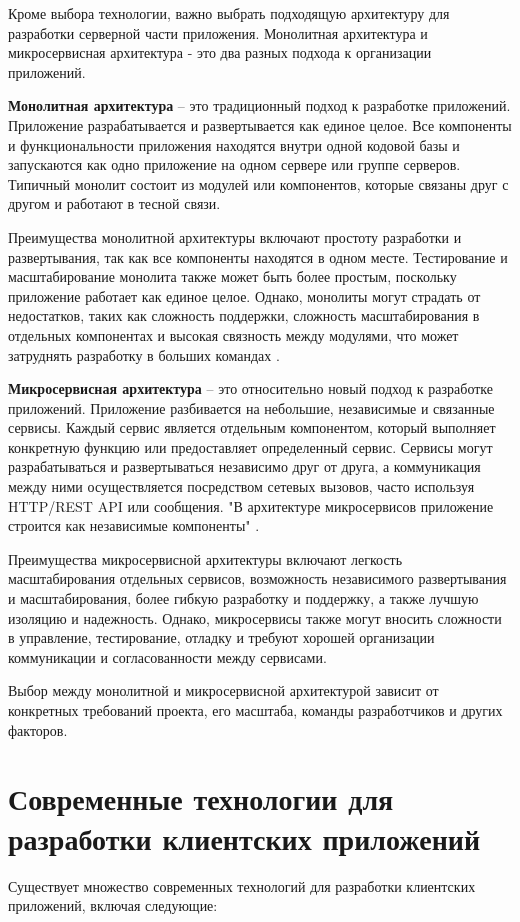 Кроме выбора технологии, важно выбрать подходящую архитектуру для разработки серверной части приложения.
Монолитная архитектура и микросервисная архитектура - это два разных подхода к организации приложений.

\textbf{Монолитная архитектура} -- это традиционный подход к разработке приложений. 
Приложение разрабатывается и развертывается как единое целое. 
Все компоненты и функциональности приложения находятся внутри одной кодовой базы и запускаются как одно приложение на одном сервере или группе серверов. 
Типичный монолит состоит из модулей или компонентов, которые связаны друг с другом и работают в тесной связи.

Преимущества монолитной архитектуры включают простоту разработки и развертывания, 
так как все компоненты находятся в одном месте. 
Тестирование и масштабирование монолита также может быть более простым, 
поскольку приложение работает как единое целое. Однако, монолиты могут страдать от недостатков, 
таких как сложность поддержки, сложность масштабирования в отдельных компонентах и 
высокая связность между модулями, что может затруднять разработку в больших командах \cite{Microservices}.

\textbf{Микросервисная архитектура} -- это относительно новый подход к разработке приложений. 
Приложение разбивается на небольшие, независимые и связанные сервисы. 
Каждый сервис является отдельным компонентом, который выполняет конкретную функцию или предоставляет определенный сервис. 
Сервисы могут разрабатываться и развертываться независимо друг от друга, 
а коммуникация между ними осуществляется посредством сетевых вызовов, 
часто используя HTTP/REST API или сообщения.
"В архитектуре микросервисов приложение строится как независимые компоненты" \cite{Kravchenko2022}.

Преимущества микросервисной архитектуры включают легкость масштабирования отдельных сервисов,
возможность независимого развертывания и масштабирования, более гибкую разработку и поддержку,
а также лучшую изоляцию и надежность. Однако, микросервисы также могут вносить сложности в управление,
тестирование, отладку и требуют хорошей организации коммуникации и согласованности между сервисами.

Выбор между монолитной и микросервисной архитектурой зависит от
конкретных требований проекта, его масштаба,
команды разработчиков и других факторов.



\section{Современные технологии для разработки клиентских приложений}
Существует множество современных технологий для разработки клиентских приложений, включая следующие:

